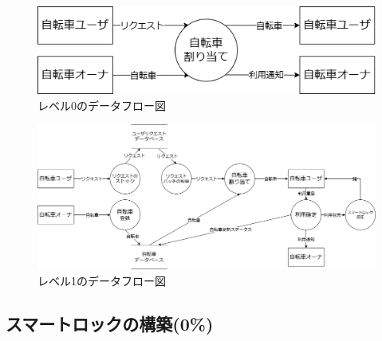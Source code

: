           \begin{figure}[htbp]
            \centering
            \includegraphics[scale=0.4]
            {figures/dfd-level0.drawio.png}
            \caption{レベル0のデータフロー図}
            \label{fig:レベル0のデータフロー図}
          \end{figure}

          \begin{figure}[htbp]
            \centering
            \includegraphics[scale=0.4]
            {figures/dfd-level1.drawio.png}
            \caption{レベル1のデータフロー図}
            \label{fig:レベル1のデータフロー図}
          \end{figure}

  \subsection{スマートロックの構築(0\%)}
    \label{sec:スマートロックの構築}
      \par 
      
